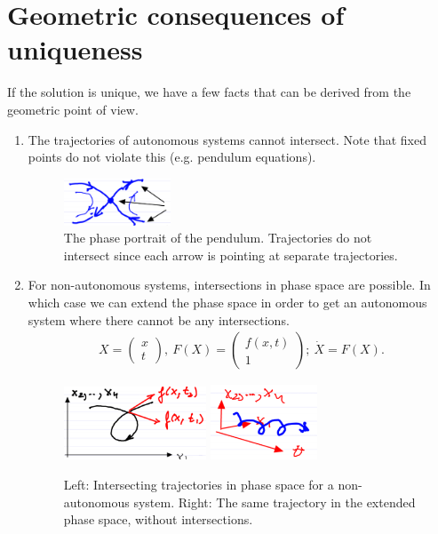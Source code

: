 \section{Geometric consequences of uniqueness}
If the solution is unique, we have a few facts that can be derived from the geometric point of view.
\begin{enumerate}
	\item The trajectories of autonomous systems cannot intersect. Note that fixed points do not violate this (e.g. pendulum equations).
		\begin{figure}[h]
			\centering
			\includegraphics[width=0.3\textwidth]{figures/ch1/3pendulum_trajectories.png}
			\caption{The phase portrait of the pendulum. Trajectories do not intersect since each arrow is pointing at separate trajectories.}
		\end{figure}
		
	\item For non-autonomous systems, intersections in phase space are possible. In which case we can extend the phase space in order to get an autonomous system where there cannot be any intersections.
		\begin{align}
			X = 
			\begin{pmatrix}
				x \\ t
			\end{pmatrix},\
			F(X) = 
			\begin{pmatrix}
				f(x,t) \\ 1
			\end{pmatrix};\
			\dot{X} = F(X).
		\end{align}
		\begin{figure}[h]
			\centering
			\includegraphics[width=0.4\textwidth]{figures/ch1/4intersecting_trajectories.png}
			\hspace{0.05\textwidth}
			\includegraphics[width=0.3\textwidth]{figures/ch1/5extended_space.png}
			\caption{Left: Intersecting trajectories in phase space for a non-autonomous system. Right: The same trajectory in the extended phase space, without intersections.}
		\end{figure}
\end{enumerate}

